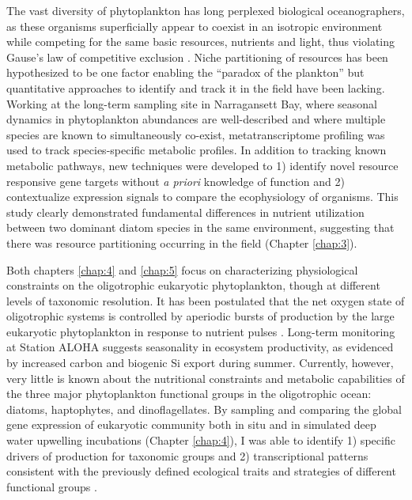 The vast diversity of phytoplankton has long perplexed biological oceanographers, as these organisms superficially appear to coexist in an isotropic environment while competing for the same basic resources, nutrients and light, thus violating Gause's law of competitive exclusion \citep{Hardin1960}. Niche partitioning of resources has been hypothesized to be one factor enabling the ``paradox of the plankton'' \citep{Hutchinson1961} but quantitative approaches to identify and track it in the field have been lacking. Working at the long-term sampling site in Narragansett Bay, where seasonal dynamics in phytoplankton abundances are well-described and where multiple species are known to simultaneously co-exist, metatranscriptome profiling was used to track species-specific metabolic profiles. In addition to tracking known metabolic pathways, new techniques were developed to 1) identify novel resource responsive gene targets without \textit{a priori} knowledge of function and 2) contextualize expression signals to compare the ecophysiology of organisms. This study clearly demonstrated fundamental differences in nutrient utilization between two dominant diatom species in the same environment, suggesting that there was resource partitioning occurring in the field (Chapter \ref{chap:3}).\par 

Both chapters \ref{chap:4} and \ref{chap:5} focus on characterizing physiological constraints on the oligotrophic eukaryotic phytoplankton, though at different levels of taxonomic resolution. It has been postulated that the net oxygen state of oligotrophic systems is controlled by aperiodic bursts of production by the large eukaryotic phytoplankton in response to nutrient pulses \citep{Karl2003}. Long-term monitoring at Station ALOHA suggests seasonality in ecosystem productivity, as evidenced by increased carbon and biogenic Si export during summer. Currently, however, very little is known about the nutritional constraints and metabolic capabilities of the three major phytoplankton functional groups in the oligotrophic ocean: diatoms, haptophytes, and dinoflagellates. By sampling and comparing the global gene expression of eukaryotic community both in situ and in simulated deep water upwelling incubations (Chapter \ref{chap:4}), I was able to identify 1) specific drivers of production for taxonomic groups and 2) transcriptional patterns consistent with the previously defined ecological traits and strategies of different functional groups \citep{Margalef1978}. \par

